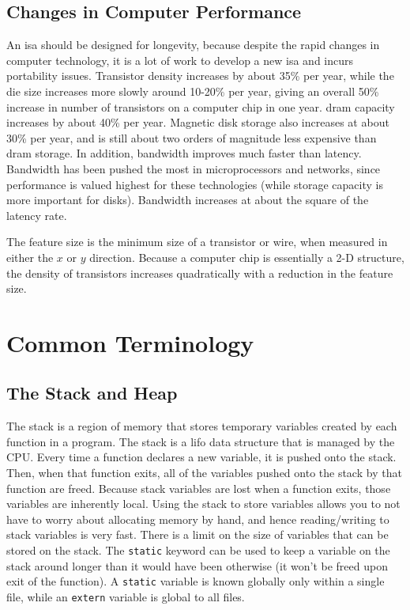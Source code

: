 \documentclass[10pt]{article}
\begin{document}
\begin{flushleft}
\subsection{Changes in Computer Performance}

An \gls{isa} should be designed for longevity, because despite the rapid changes in computer technology, it is a lot of work to develop a new \gls{isa} and incurs portability issues. Transistor density increases by about 35\% per year, while the die size increases more slowly around 10-20\% per year, giving an overall 50\% increase in number of transistors on a computer chip in one year. \gls{dram} capacity increases by about 40\% per year. Magnetic disk storage also increases at about 30\% per year, and is still about two orders of magnitude less expensive than \gls{dram} storage. In addition, bandwidth improves much faster than latency. Bandwidth has been pushed the most in microprocessors and networks, since performance is valued highest for these technologies (while storage capacity is more important for disks). Bandwidth increases at about the square of the latency rate.

The feature size is the minimum size of a transistor or wire, when measured in either the \(x\) or \(y\) direction. Because a computer chip is essentially a 2-D structure, the density of transistors increases quadratically with a reduction in the feature size.


\section{Common Terminology}

\subsection{The Stack and Heap}

The stack is a region of memory that stores temporary variables created by each function in a program. The stack is a \gls{lifo} data structure that is managed by the CPU. Every time a function declares a new variable, it is pushed onto the stack. Then, when that function exits, all of the variables pushed onto the stack by that function are freed. Because stack variables are lost when a function exits, those variables are inherently local. Using the stack to store variables allows you to not have to worry about allocating memory by hand, and hence reading/writing to stack variables is very fast. There is a limit on the size of variables that can be stored on the stack. The {\tt static} keyword can be used to keep a variable on the stack around longer than it would have been otherwise (it won't be freed upon exit of the function). A {\tt static} variable is known globally only within a single file, while an {\tt extern} variable is global to all files.


\end{flushleft}
\end{document}
